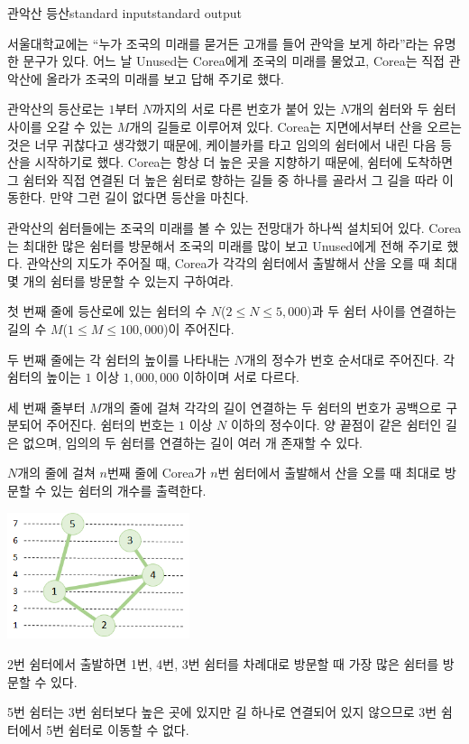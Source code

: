 \begin{problem}{관악산 등산}{standard input}{standard output}

서울대학교에는 ``누가 조국의 미래를 묻거든 고개를 들어 관악을 보게 하라''라는 유명한 문구가 있다. 어느 날 Unused는 Corea에게 조국의 미래를 물었고, Corea는 직접 관악산에 올라가 조국의 미래를 보고 답해 주기로 했다.

관악산의 등산로는 $1$부터 $N$까지의 서로 다른 번호가 붙어 있는 $N$개의 쉼터와 두 쉼터 사이를 오갈 수 있는 $M$개의 길들로 이루어져 있다. Corea는 지면에서부터 산을 오르는 것은 너무 귀찮다고 생각했기 때문에, 케이블카를 타고 임의의 쉼터에서 내린 다음 등산을 시작하기로 했다. Corea는 항상 더 높은 곳을 지향하기 때문에, 쉼터에 도착하면 그 쉼터와 직접 연결된 더 높은 쉼터로 향하는 길들 중 하나를 골라서 그 길을 따라 이동한다. 만약 그런 길이 없다면 등산을 마친다.

관악산의 쉼터들에는 조국의 미래를 볼 수 있는 전망대가 하나씩 설치되어 있다. Corea는 최대한 많은 쉼터를 방문해서 조국의 미래를 많이 보고 Unused에게 전해 주기로 했다. 관악산의 지도가 주어질 때, Corea가 각각의 쉼터에서 출발해서 산을 오를 때 최대 몇 개의 쉼터를 방문할 수 있는지 구하여라.

\InputFile
첫 번째 줄에 등산로에 있는 쉼터의 수 $N$($2 \le N \le 5,000$)과 두 쉼터 사이를 연결하는 길의 수 $M$($1 \le M \le 100,000$)이 주어진다.

두 번째 줄에는 각 쉼터의 높이를 나타내는 $N$개의 정수가 번호 순서대로 주어진다. 각 쉼터의 높이는 $1$ 이상 $1,000,000$ 이하이며 서로 다르다.

세 번째 줄부터 $M$개의 줄에 걸쳐 각각의 길이 연결하는 두 쉼터의 번호가 공백으로 구분되어 주어진다. 쉼터의 번호는 $1$ 이상 $N$ 이하의 정수이다. 양 끝점이 같은 쉼터인 길은 없으며, 임의의 두 쉼터를 연결하는 길이 여러 개 존재할 수 있다.

\OutputFile

$N$개의 줄에 걸쳐 $n$번째 줄에 Corea가 $n$번 쉼터에서 출발해서 산을 오를 때 최대로 방문할 수 있는 쉼터의 개수를 출력한다.

\Example

\begin{example}
%
\end{example}

\Notes
\begin{center}
  \includegraphics[width=0.4\textwidth]{climb.png}
\end{center}

2번 쉼터에서 출발하면 1번, 4번, 3번 쉼터를 차례대로 방문할 때 가장 많은 쉼터를 방문할 수 있다.

5번 쉼터는 3번 쉼터보다 높은 곳에 있지만 길 하나로 연결되어 있지 않으므로 3번 쉼터에서 5번 쉼터로 이동할 수 없다.

\end{problem}
